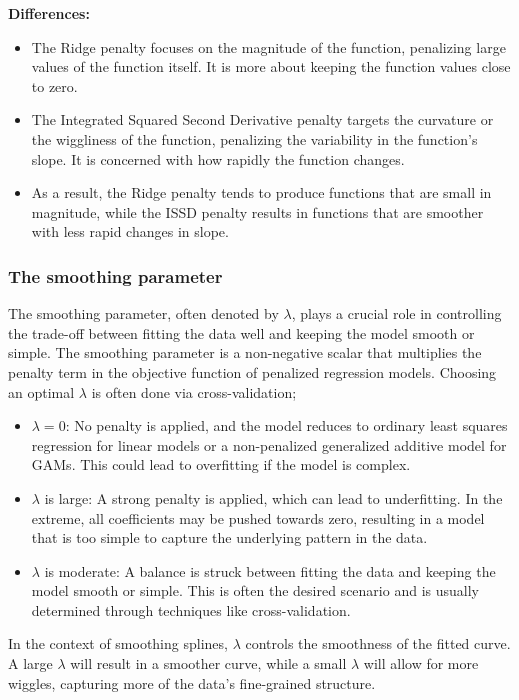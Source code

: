 \documentclass[12pt, twoside,hidelinks]{article}
\theoremstyle{definition}
\numberwithin{equation}{section}
\begin{document}
\textbf{Differences:}
\begin{itemize}
    \item The Ridge penalty focuses on the magnitude of the function, penalizing large values of the function itself. It is more about keeping the function values close to zero.
    \item The Integrated Squared Second Derivative penalty targets the curvature or the wiggliness of the function, penalizing the variability in the function's slope. It is concerned with how rapidly the function changes.
    \item As a result, the Ridge penalty tends to produce functions that are small in magnitude, while the ISSD penalty results in functions that are smoother with less rapid changes in slope.
\end{itemize}

\subsubsection{The smoothing parameter}

The smoothing parameter, often denoted by \( \lambda \), plays a crucial role in controlling the trade-off between fitting the data well and keeping the model smooth or simple. The smoothing parameter is a non-negative scalar that multiplies the penalty term in the objective function of penalized regression models. Choosing an optimal \( \lambda \) is often done via cross-validation;


\begin{itemize}
    \item \( \lambda = 0 \): No penalty is applied, and the model reduces to ordinary least squares regression for linear models or a non-penalized generalized additive model for GAMs. This could lead to overfitting if the model is complex.
    \item \( \lambda \) is large: A strong penalty is applied, which can lead to underfitting. In the extreme, all coefficients may be pushed towards zero, resulting in a model that is too simple to capture the underlying pattern in the data.
    \item \( \lambda \) is moderate: A balance is struck between fitting the data and keeping the model smooth or simple. This is often the desired scenario and is usually determined through techniques like cross-validation.
\end{itemize}

In the context of smoothing splines, \( \lambda \) controls the smoothness of the fitted curve. A large \( \lambda \) will result in a smoother curve, while a small \( \lambda \) will allow for more wiggles, capturing more of the data's fine-grained structure.
\end{document}
